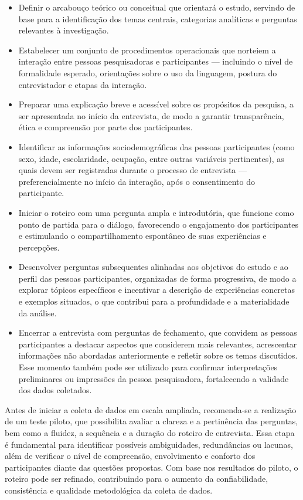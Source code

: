 \documentclass[12pt, a4paper, openany]{book}
\begin{document}
\begin{itemize}
\item Definir o arcabou\c{c}o te\'orico ou conceitual que orientar\'a o estudo, servindo de base para a identifica\c{c}\~ao dos temas centrais, categorias anal\'iticas e perguntas relevantes \`a investiga\c{c}\~ao.
\item Estabelecer um conjunto de procedimentos operacionais que norteiem a intera\c{c}\~ao entre pessoas pesquisadoras e participantes --- incluindo o n\'ivel de formalidade esperado, orienta\c{c}\~oes sobre o uso da linguagem, postura do entrevistador e etapas da intera\c{c}\~ao.
\item Preparar uma explica\c{c}\~ao breve e acess\'ivel sobre os prop\'ositos da pesquisa, a ser apresentada no in\'icio da entrevista, de modo a garantir transpar\^encia, \'etica e compreens\~ao por parte dos participantes.
\item Identificar as informa\c{c}\~oes sociodemogr\'aficas das pessoas participantes (como sexo, idade, escolaridade, ocupa\c{c}\~ao, entre outras vari\'aveis pertinentes), as quais devem ser registradas durante o processo de entrevista --- preferencialmente no in\'icio da intera\c{c}\~ao, ap\'os o consentimento do participante.
\item Iniciar o roteiro com uma pergunta ampla e introdut\'oria, que funcione como ponto de partida para o di\'alogo, favorecendo o engajamento dos participantes e estimulando o compartilhamento espont\^aneo de suas experi\^encias e percep\c{c}\~oes.
\item Desenvolver perguntas subsequentes alinhadas aos objetivos do estudo e ao perfil das pessoas participantes, organizadas de forma progressiva, de modo a explorar t\'opicos espec\'ificos e incentivar a descri\c{c}\~ao de experi\^encias concretas e exemplos situados, o que contribui para a profundidade e a materialidade da an\'alise.
\item Encerrar a entrevista com perguntas de fechamento, que convidem as pessoas participantes a destacar aspectos que considerem mais relevantes, acrescentar informa\c{c}\~oes n\~ao abordadas anteriormente e refletir sobre os temas discutidos. Esse momento tamb\'em pode ser utilizado para confirmar interpreta\c{c}\~oes preliminares ou impress\~oes da pessoa pesquisadora, fortalecendo a validade dos dados coletados.
\end{itemize}

Antes de iniciar a coleta de dados em escala ampliada, recomenda-se a realiza\c{c}\~ao de um teste piloto, que possibilita avaliar a clareza e a pertin\^encia das perguntas, bem como a fluidez, a sequ\^encia e a dura\c{c}\~ao do roteiro de entrevista. Essa etapa \'e fundamental para identificar poss\'iveis ambiguidades, redund\^ancias ou lacunas, al\'em de verificar o n\'ivel de compreens\~ao, envolvimento e conforto dos participantes diante das quest\~oes propostas. Com base nos resultados do piloto, o roteiro pode ser refinado, contribuindo para o aumento da confiabilidade, consist\^encia e qualidade metodol\'ogica da coleta de dados.
\end{document}
